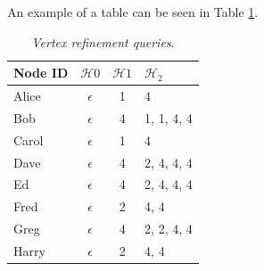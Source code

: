 An example of a table can be seen in Table \ref{table:ejemplo_vertex_refi_query}.

\begin{table}
\centering{}
\begin{tabular}{ l || c | c | l }
\hline
Node ID & $\mathcal{H}{0}$ & $\mathcal{H}{1}$ & $\mathcal{H}_{2}$ \\
\hline
\hline
Alice & $\epsilon$ & 1 & {4} \\
\hline
Bob & $\epsilon$ & 4 & {1, 1, 4, 4} \\
\hline
Carol & $\epsilon$ & 1 & {4} \\
\hline
Dave & $\epsilon$ & 4 & {2, 4, 4, 4} \\
\hline
Ed & $\epsilon$ & 4 & {2, 4, 4, 4} \\
\hline
Fred & $\epsilon$ & 2 & {4, 4} \\
\hline
Greg & $\epsilon$ & 4 & {2, 2, 4, 4} \\
\hline
Harry & $\epsilon$ & 2 & {4, 4} \\
\hline
\end{tabular}
\caption{\textit{Vertex refinement queries}.}
\label{table:ejemplo_vertex_refi_query}
\end{table}